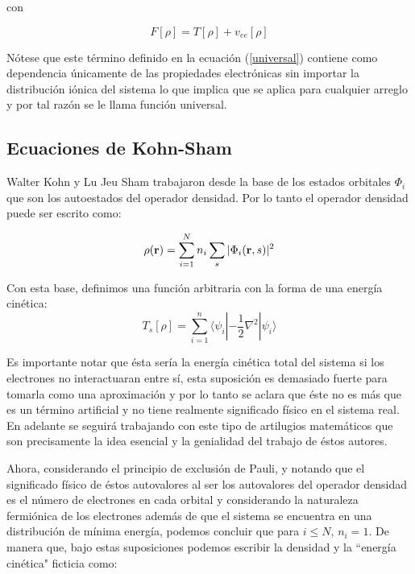 \documentclass [11pt]{article}
\begin{document}
con

\begin{equation}\label{universal}
	F[\rho]=T[\rho]+v_{ee}[\rho]
\end{equation}

Nótese que este término definido en la ecuación (\ref{universal}) contiene como dependencia únicamente de las propiedades electrónicas sin importar la distribución iónica del sistema lo que implica que se aplica para cualquier arreglo y por tal razón se le llama función universal.

\subsection{Ecuaciones de Kohn-Sham}

Walter Kohn y Lu Jeu Sham trabajaron desde la base de los estados orbitales $\Phi_i$  que son los autoestados del operador densidad. Por lo tanto el operador densidad puede ser escrito como:

\begin{equation}
    \rho ({\bf r})=\sum_{i=1}^Nn_i\sum_s^{}|\Phi_i({\bf r}, s)|^2
\end{equation}

Con esta base, definimos una función arbitraria con la forma de una energía cinética:
\begin{equation}
	T_s[\rho]=\sum_{i=1}^n\langle\psi_i|-\frac{1}{2}\nabla^2|\psi_i\rangle
\end{equation}

Es importante notar que ésta sería la energía cinética total del sistema si los electrones no interactuaran entre sí, esta suposición es demasiado fuerte para tomarla como una aproximación y por lo tanto se aclara que éste no es más que  es un término artificial y no tiene realmente significado físico en el sistema real. En adelante se seguirá trabajando con este tipo de artilugios matemáticos que son precisamente la idea esencial y la genialidad del trabajo de éstos autores.

Ahora, considerando el principio de exclusión de Pauli, y notando que el significado físico de éstos autovalores al ser los autovalores del operador densidad es el número de electrones en cada orbital y considerando la naturaleza fermiónica de los electrones además de que el sistema se encuentra en una distribución de mínima energía, podemos concluir que para $i\leq N $, $n_i=1 $. De manera que, bajo estas suposiciones podemos escribir la densidad y la ``energía cinética"  \hspace{0.1 cm}ficticia como:
\end{document}
